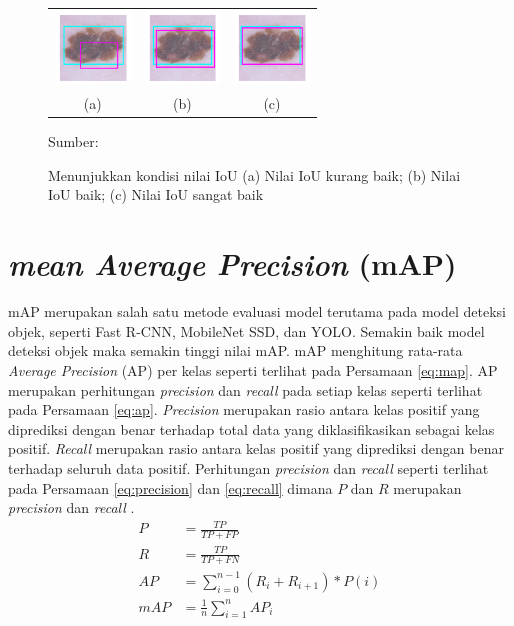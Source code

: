 \begin{figure}[H]
    \centering
    \begin{tabular}{ccc}
        \includegraphics[width=2cm]{../img/IoU Poor - Latex.PNG}
        &
        \includegraphics[width=2cm]{../img/IoU Good - Latex.PNG}
        &
        \includegraphics[width=2cm]{../img/IoU Excellent - Latex.PNG}\\
        (a) &(b) &(c)\\
    \end{tabular}
    \caption{Menunjukkan kondisi nilai IoU (a) Nilai IoU kurang baik; (b) Nilai IoU baik; (c) Nilai IoU sangat baik}
    \label{fig:iou-cat}
    Sumber: \citep{Cowton2019}
\end{figure}

\section{\textit{mean Average Precision} (mAP)}
mAP merupakan salah satu metode evaluasi model terutama pada model deteksi objek, seperti Fast R-CNN, MobileNet SSD, dan YOLO. Semakin baik model deteksi objek maka semakin tinggi nilai mAP. mAP menghitung rata-rata \textit{Average Precision} (AP) per kelas seperti terlihat pada Persamaan \ref{eq:map}. AP merupakan perhitungan \textit{precision} dan \textit{recall} pada setiap kelas seperti terlihat pada Persamaan \ref{eq:ap}. \textit{Precision} merupakan rasio antara kelas positif yang diprediksi dengan benar terhadap total data yang diklasifikasikan sebagai kelas positif. \textit{Recall} merupakan rasio antara kelas positif yang diprediksi dengan benar terhadap seluruh data positif. Perhitungan \textit{precision} dan \textit{recall} seperti terlihat pada Persamaan \ref{eq:precision} dan \ref{eq:recall} dimana $P$ dan $R$ merupakan \textit{precision} dan \textit{recall} \citep{Shultz2017}.
\begin{align}
    \label{eq:precision}
    P &= \frac{TP}{TP+FP}\\
    \label{eq:recall}
    R &= \frac{TP}{TP+FN}\\
    \label{eq:ap}
    AP &= \sum_{i=0}^{n-1} (R_i+R_{i+1})\ast P(i)\\
    \label{eq:map}
    mAP &= \frac{1}{n}\sum_{i=1}^{n} AP_i
\end{align}


